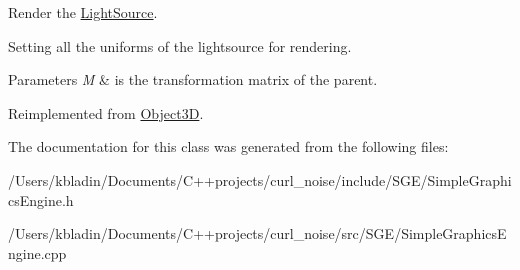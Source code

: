 Render the \hyperlink{class_light_source}{Light\-Source}. 

Setting all the uniforms of the lightsource for rendering. 
\begin{DoxyParams}{Parameters}
{\em M} & is the transformation matrix of the parent. \\
\hline
\end{DoxyParams}


Reimplemented from \hyperlink{class_object3_d_afa3e765f12707f3dd0fb8d24de9a68b7}{Object3\-D}.



The documentation for this class was generated from the following files\-:\begin{DoxyCompactItemize}
\item 
/\-Users/kbladin/\-Documents/\-C++projects/curl\-\_\-noise/include/\-S\-G\-E/Simple\-Graphics\-Engine.\-h\item 
/\-Users/kbladin/\-Documents/\-C++projects/curl\-\_\-noise/src/\-S\-G\-E/Simple\-Graphics\-Engine.\-cpp\end{DoxyCompactItemize}
